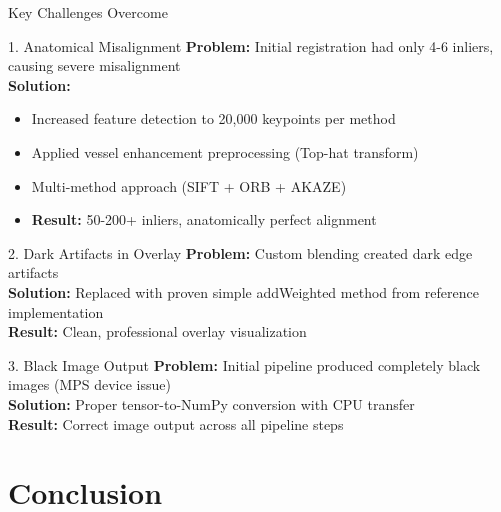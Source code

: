 \documentclass[aspectratio=169]{beamer}
\begin{document}
\begin{frame}{Key Challenges Overcome}
\begin{block}{1. Anatomical Misalignment}
\textbf{Problem:} Initial registration had only 4-6 inliers, causing severe misalignment\\
\textbf{Solution:}
\begin{itemize}
    \item Increased feature detection to 20,000 keypoints per method
    \item Applied vessel enhancement preprocessing (Top-hat transform)
    \item Multi-method approach (SIFT + ORB + AKAZE)
    \item \textcolor{green!50!black}{\textbf{Result:}} 50-200+ inliers, anatomically perfect alignment
\end{itemize}
\end{block}

\begin{block}{2. Dark Artifacts in Overlay}
\textbf{Problem:} Custom blending created dark edge artifacts\\
\textbf{Solution:} Replaced with proven simple addWeighted method from reference implementation\\
\textcolor{green!50!black}{\textbf{Result:}} Clean, professional overlay visualization
\end{block}

\begin{block}{3. Black Image Output}
\textbf{Problem:} Initial pipeline produced completely black images (MPS device issue)\\
\textbf{Solution:} Proper tensor-to-NumPy conversion with CPU transfer\\
\textcolor{green!50!black}{\textbf{Result:}} Correct image output across all pipeline steps
\end{block}
\end{frame}

\section{Conclusion}
\end{document}
